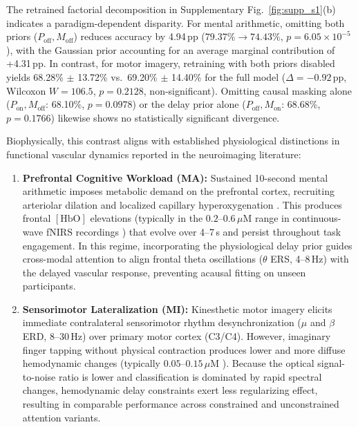 \documentclass[journal]{IEEEtran}
\begin{document}
The retrained factorial decomposition in Supplementary Fig.~\ref{fig:supp_s1}(b) indicates a paradigm-dependent disparity. For mental arithmetic, omitting both priors ($P_{\mathrm{off}}, M_{\mathrm{off}}$) reduces accuracy by 4.94\,pp ($79.37\% \to 74.43\%$, $p = 6.05 \times 10^{-5}$), with the Gaussian prior accounting for an average marginal contribution of +4.31\,pp. In contrast, for motor imagery, retraining with both priors disabled yields 68.28\% $\pm$ 13.72\% vs.\ 69.20\% $\pm$ 14.40\% for the full model ($\Delta = -0.92$\,pp, Wilcoxon $W = 106.5$, $p = 0.2128$, non-significant). Omitting causal masking alone ($P_{\mathrm{on}}, M_{\mathrm{off}}$: 68.10\%, $p = 0.0978$) or the delay prior alone ($P_{\mathrm{off}}, M_{\mathrm{on}}$: 68.68\%, $p = 0.1766$) likewise shows no statistically significant divergence.

Biophysically, this contrast aligns with established physiological distinctions in functional vascular dynamics reported in the neuroimaging literature:
\begin{enumerate}
    \item \textbf{Prefrontal Cognitive Workload (MA):} Sustained 10-second mental arithmetic imposes metabolic demand on the prefrontal cortex, recruiting arteriolar dilation and localized capillary hyperoxygenation \cite{buxton1998dynamics, scholkmann2014review}. This produces frontal $[\mathrm{HbO}]$ elevations (typically in the $0.2\text{--}0.6\,\mu\mathrm{M}$ range in continuous-wave fNIRS recordings \cite{shin2017open}) that evolve over 4--7\,s and persist throughout task engagement. In this regime, incorporating the physiological delay prior guides cross-modal attention to align frontal theta oscillations ($\theta$ ERS, 4--8\,Hz) with the delayed vascular response, preventing acausal fitting on unseen participants.
    \item \textbf{Sensorimotor Lateralization (MI):} Kinesthetic motor imagery elicits immediate contralateral sensorimotor rhythm desynchronization ($\mu$ and $\beta$ ERD, 8--30\,Hz) over primary motor cortex (C3/C4). However, imaginary finger tapping without physical contraction produces lower and more diffuse hemodynamic changes (typically $0.05\text{--}0.15\,\mu\mathrm{M}$ \cite{shin2017open, pinti2020present}). Because the optical signal-to-noise ratio is lower and classification is dominated by rapid spectral changes, hemodynamic delay constraints exert less regularizing effect, resulting in comparable performance across constrained and unconstrained attention variants.
\end{enumerate}
\end{document}
